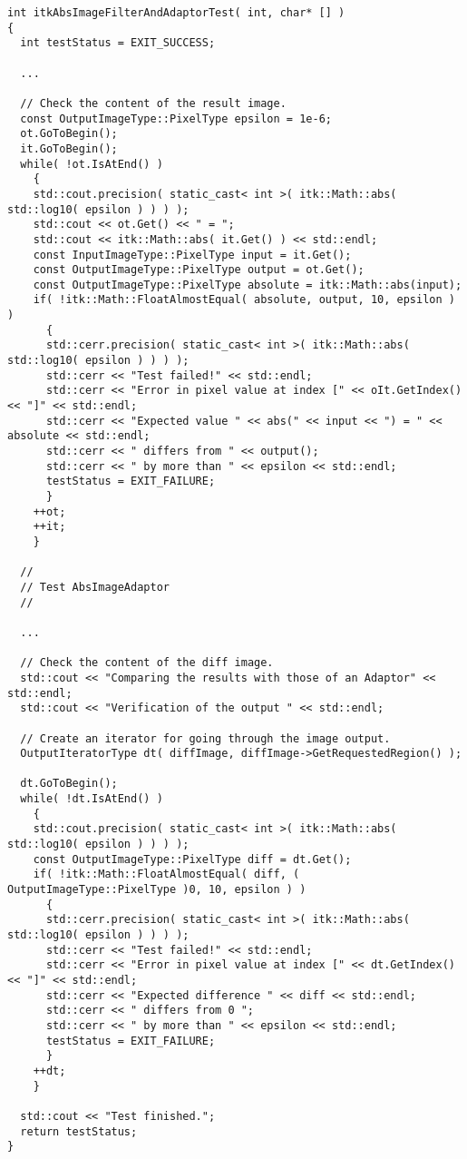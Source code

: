 \small
\begin{verbatim}
int itkAbsImageFilterAndAdaptorTest( int, char* [] )
{
  int testStatus = EXIT_SUCCESS;

  ...

  // Check the content of the result image.
  const OutputImageType::PixelType epsilon = 1e-6;
  ot.GoToBegin();
  it.GoToBegin();
  while( !ot.IsAtEnd() )
    {
    std::cout.precision( static_cast< int >( itk::Math::abs( std::log10( epsilon ) ) ) );
    std::cout << ot.Get() << " = ";
    std::cout << itk::Math::abs( it.Get() ) << std::endl;
    const InputImageType::PixelType input = it.Get();
    const OutputImageType::PixelType output = ot.Get();
    const OutputImageType::PixelType absolute = itk::Math::abs(input);
    if( !itk::Math::FloatAlmostEqual( absolute, output, 10, epsilon ) )
      {
      std::cerr.precision( static_cast< int >( itk::Math::abs( std::log10( epsilon ) ) ) );
      std::cerr << "Test failed!" << std::endl;
      std::cerr << "Error in pixel value at index [" << oIt.GetIndex() << "]" << std::endl;
      std::cerr << "Expected value " << abs(" << input << ") = " << absolute << std::endl;
      std::cerr << " differs from " << output();
      std::cerr << " by more than " << epsilon << std::endl;
      testStatus = EXIT_FAILURE;
      }
    ++ot;
    ++it;
    }

  //
  // Test AbsImageAdaptor
  //

  ...

  // Check the content of the diff image.
  std::cout << "Comparing the results with those of an Adaptor" << std::endl;
  std::cout << "Verification of the output " << std::endl;

  // Create an iterator for going through the image output.
  OutputIteratorType dt( diffImage, diffImage->GetRequestedRegion() );

  dt.GoToBegin();
  while( !dt.IsAtEnd() )
    {
    std::cout.precision( static_cast< int >( itk::Math::abs( std::log10( epsilon ) ) ) );
    const OutputImageType::PixelType diff = dt.Get();
    if( !itk::Math::FloatAlmostEqual( diff, ( OutputImageType::PixelType )0, 10, epsilon ) )
      {
      std::cerr.precision( static_cast< int >( itk::Math::abs( std::log10( epsilon ) ) ) );
      std::cerr << "Test failed!" << std::endl;
      std::cerr << "Error in pixel value at index [" << dt.GetIndex() << "]" << std::endl;
      std::cerr << "Expected difference " << diff << std::endl;
      std::cerr << " differs from 0 ";
      std::cerr << " by more than " << epsilon << std::endl;
      testStatus = EXIT_FAILURE;
      }
    ++dt;
    }

  std::cout << "Test finished.";
  return testStatus;
}
\end{verbatim}
\normalsize

